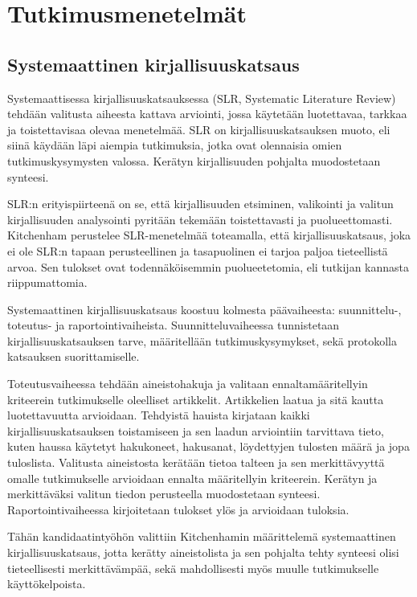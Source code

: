\section{Tutkimusmenetelmät}
\subsection{Systemaattinen kirjallisuuskatsaus}
Systemaattisessa kirjallisuuskatsauksessa (SLR, Systematic Literature Review) tehdään valitusta aiheesta kattava arviointi, jossa käytetään luotettavaa, tarkkaa ja toistettavisaa olevaa menetelmää. SLR on kirjallisuuskatsauksen muoto, eli siinä käydään läpi aiempia tutkimuksia, jotka ovat olennaisia omien tutkimuskysymysten valossa. Kerätyn kirjallisuuden pohjalta muodostetaan synteesi. \citep{Kitchenham2007}

SLR:n erityispiirteenä on se, että kirjallisuuden etsiminen, valikointi ja valitun kirjallisuuden analysointi pyritään tekemään toistettavasti ja puolueettomasti. Kitchenham perustelee SLR-menetelmää toteamalla, että kirjallisuuskatsaus, joka ei ole SLR:n tapaan perusteellinen ja tasapuolinen ei tarjoa paljoa tieteellistä arvoa. Sen tulokset ovat todennäköisemmin puolueetetomia, eli tutkijan kannasta riippumattomia. \citep{Kitchenham2007}

Systemaattinen kirjallisuuskatsaus koostuu kolmesta päävaiheesta: suunnittelu-, toteutus- ja raportointivaiheista. Suunnitteluvaiheessa tunnistetaan kirjallisuuskatsauksen tarve, määritellään tutkimuskysymykset, sekä protokolla katsauksen suorittamiselle. 

Toteutusvaiheessa tehdään aineistohakuja ja valitaan ennaltamääritellyin kriteerein tutkimukselle oleelliset artikkelit. Artikkelien laatua ja sitä kautta luotettavuutta arvioidaan. Tehdyistä hauista kirjataan kaikki kirjallisuuskatsauksen toistamiseen ja sen laadun arviointiin tarvittava tieto, kuten haussa käytetyt hakukoneet, hakusanat, löydettyjen tulosten määrä ja jopa tuloslista. Valitusta aineistosta kerätään tietoa talteen ja sen merkittävyyttä omalle tutkimukselle arvioidaan ennalta määritellyin kriteerein. Kerätyn ja merkittäväksi valitun tiedon perusteella muodostetaan synteesi. Raportointivaiheessa kirjoitetaan tulokset ylös ja arvioidaan tuloksia.

Tähän kandidaatintyöhön valittiin Kitchenhamin määrittelemä systemaattinen kirjallisuuskatsaus, jotta kerätty aineistolista ja sen pohjalta tehty synteesi olisi tieteellisesti merkittävämpää, sekä mahdollisesti myös muulle tutkimukselle käyttökelpoista.


